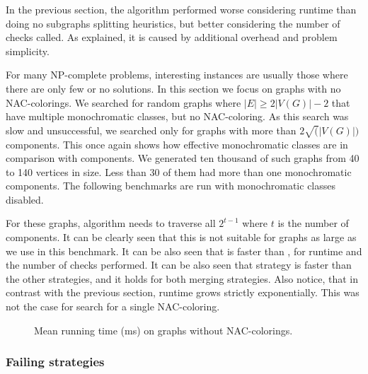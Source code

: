 In the previous section, the \Subgraphs{} algorithm performed worse considering runtime
than doing no subgraphs splitting heuristics,
but better considering the number of checks called.
As explained, it is caused by additional overhead and problem simplicity.

For many NP-complete problems, interesting instances are usually
those where there are only few or no solutions.
In this section we focus on graphs with no NAC-colorings.
We searched for random graphs where \( |E| \ge 2|V(G)| - 2 \) that have
multiple monochromatic classes, but no NAC-coloring.
As this search was slow and unsuccessful, we searched only for
graphs with more than \( 2\sqrt(|V(G)|) \) \trcon{} components.
This once again shows how effective monochromatic classes are
in comparison with \trcon{} components.
We generated ten thousand of such graphs from 40 to 140 vertices in size.
Less than 30 of them had more than one monochromatic components.
The following benchmarks are run with monochromatic classes disabled.

For these graphs, \NaiveCycles{} algorithm needs to traverse all \( 2^{t-1} \)
where \( t \) is the number of \trcon{} components. It can be clearly seen that
this is not suitable for graphs as large as we use in this benchmark.
It can be also seen that \SharedVertices{} is faster than \MergeLinear{},
for runtime and the number of checks performed.
It can be also seen that \NeighborsDegree{} strategy is
faster than the other strategies, and it holds for both merging strategies.
Also notice, that in contrast with the previous section,
runtime grows strictly exponentially. This was not the case for search for a single NAC-coloring.

\begin{figure}[ht]
	\centering
	\scalebox{0.5}{}
	\caption[Running time on graphs without NAC-colorings.]{
		Mean running time (ms) on graphs without NAC-colorings.}%
	\label{fig:graph_time_no_nac_coloring}
\end{figure}


\subsubsection{Failing strategies}%
\label{sec:failing_strategies}

